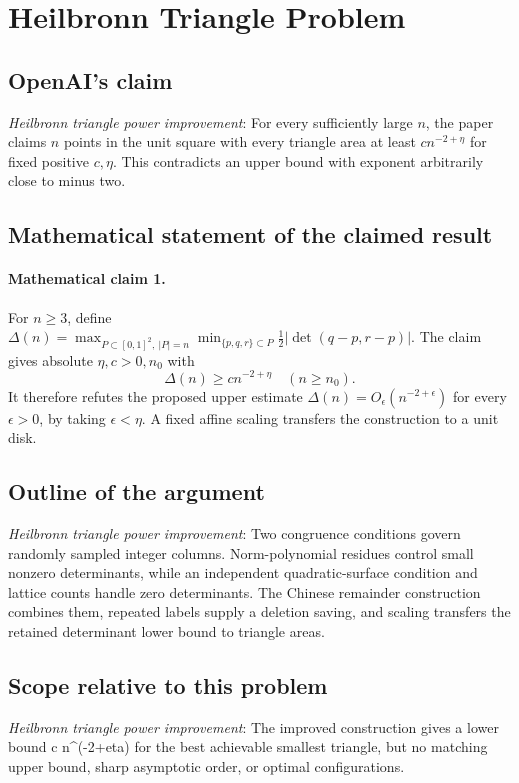 \documentclass[11pt]{article}
\begin{document}
\section*{Heilbronn Triangle Problem}

\subsection{OpenAI's claim}
\textit{Heilbronn triangle power improvement}: For every sufficiently large $n$, the paper claims $n$ points in the unit square with every triangle area at least $c n^{-2+\eta}$ for fixed positive $c,\eta$. This contradicts an upper bound with exponent arbitrarily close to minus two.

\subsection{Mathematical statement of the claimed result}
\paragraph{Mathematical claim 1.} For $n\ge3$, define $\Delta(n)=\max_{P\subset[0,1]^2,\ |P|=n}\min_{\{p,q,r\}\subset P}\tfrac12|\det(q-p,r-p)|$. The claim gives absolute $\eta,c>0,n_0$ with \[\Delta(n)\ge cn^{-2+\eta}\quad(n\ge n_0).\] It therefore refutes the proposed upper estimate $\Delta(n)=O_\epsilon(n^{-2+\epsilon})$ for every $\epsilon>0$, by taking $\epsilon<\eta$. A fixed affine scaling transfers the construction to a unit disk.

\subsection{Outline of the argument}
\textit{Heilbronn triangle power improvement}: Two congruence conditions govern randomly sampled integer columns. Norm-polynomial residues control small nonzero determinants, while an independent quadratic-surface condition and lattice counts handle zero determinants. The Chinese remainder construction combines them, repeated labels supply a deletion saving, and scaling transfers the retained determinant lower bound to triangle areas.

\subsection{Scope relative to this problem}
\textit{Heilbronn triangle power improvement}: The improved construction gives a lower bound c n\textasciicircum{}(-2+eta) for the best achievable smallest triangle, but no matching upper bound, sharp asymptotic order, or optimal configurations.
\end{document}
